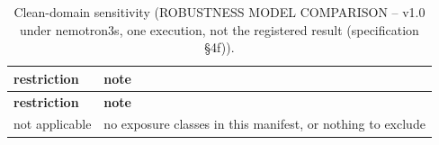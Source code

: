 \begingroup\footnotesize
\begin{longtable}{>{\raggedright\arraybackslash}p{126.4pt}>{\raggedright\arraybackslash}p{304.6pt}}
\caption{Clean-domain sensitivity (ROBUSTNESS MODEL COMPARISON -- v1.0 under nemotron3s, one execution, not the registered result (specification §4f)).} \\
\toprule
\textbf{restriction} & \textbf{note} \\
\midrule
\endfirsthead
\toprule
\textbf{restriction} & \textbf{note} \\
\midrule
\endhead
\bottomrule
\endfoot
not applicable & no exposure classes in this manifest, or nothing to exclude \\
\end{longtable}
\endgroup
